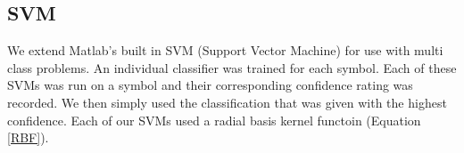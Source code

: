 \subsection{SVM}
We extend Matlab's built in SVM (Support Vector Machine) for use with multi class problems. An individual classifier was trained for each symbol. Each of these SVMs was run on a symbol and their corresponding confidence rating was recorded. We then simply used the classification that was given with the highest confidence. Each of our SVMs used a radial basis kernel functoin (Equation \ref{RBF}). 
